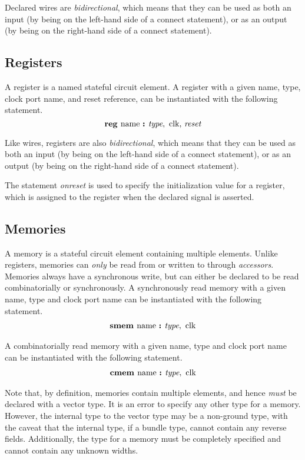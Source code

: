 \documentclass[10pt]{article}
\begin{document}
Declared wires are {\em bidirectional}, which means that they can be used as both an input (by being on the left-hand side of a connect statement), or as an output (by being on the right-hand side of a connect statement).

\subsection{Registers}
A register is a named stateful circuit element.
A register with a given name, type, clock port name, and reset reference, can be instantiated with the following statement.
\[
\text{\bf reg\ } \text{name } \text{\bf :\ } \text{\em type},\text{ clk, } \text{\em reset} \\
\]

Like wires, registers are also {\em bidirectional}, which means that they can be used as both an input (by being on the left-hand side of a connect statement), or as an output (by being on the right-hand side of a connect statement). 

The statement {\em onreset} is used to specify the initialization value for a register, which is assigned to the register when the declared  signal is asserted.

\subsection{Memories}
A memory is a stateful circuit element containing multiple elements.
Unlike registers, memories can {\em only} be read from or written to through {\em accessors}.
Memories always have a synchronous write, but can either be declared to be read combinatorially or synchronously.
A synchronously read memory with a given name, type and clock port name can be instantiated with the following statement.
\[
\begin{aligned}
\text{\bf smem\ } \text{name } \text{\bf :\ } \text{\em type},\text{ clk} \\
\end{aligned}
\]

A combinatorially read memory with a given name, type and clock port name can be instantiated with the following statement.
\[
\begin{aligned}
\text{\bf cmem\ } \text{name } \text{\bf :\ } \text{\em type},\text{ clk} \\
\end{aligned}
\]

Note that, by definition, memories contain multiple elements, and hence {\em must} be declared with a vector type.
It is an error to specify any other type for a memory.
However, the internal type to the vector type may be a non-ground type, with the caveat that the internal type, if a bundle type, cannot contain any reverse fields.
Additionally, the type for a memory must be completely specified and cannot contain any unknown widths.
\end{document}
